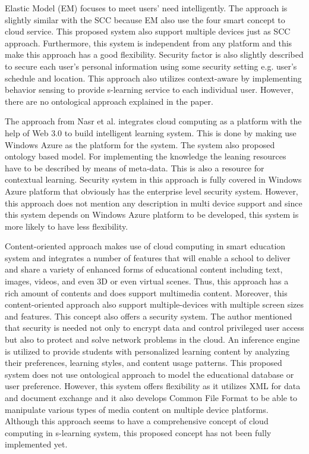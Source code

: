 \documentclass[journal]{vgtc}
\begin{document}
Elastic Model (EM) \cite{Kim2013} focuses to meet users' need intelligently. The approach is slightly similar with the SCC because EM also use the four smart concept to cloud service. This proposed system also support multiple devices just as SCC approach. Furthermore, this system is independent from any platform and this make this approach has a good flexibility. Security factor is also slightly described to secure each user's personal information using some security setting e.g. user's schedule and location. This approach also utilizes context-aware by implementing behavior sensing to provide s-learning service to each individual user. However, there are no ontological approach explained in the paper. 

The approach from Nasr et al. \cite{nasr2012proposed} integrates cloud computing as a platform with the help of Web 3.0 to build intelligent learning system. This is done by making use Windows Azure as the platform for the system. The system also proposed ontology based model. For implementing the knowledge the leaning resources have to be described by means of meta-data. This is also a resource for contextual learning. Security system in this approach is fully covered in Windows Azure platform that obviously has the enterprise level security system. However, this approach does not mention any description in multi device support and since this system depends on Windows Azure platform to be developed, this system is more likely to have less flexibility.

Content-oriented approach \cite{jeong2013content} makes use of cloud computing in smart education system and integrates a number of features that will enable a school to deliver and share a variety of enhanced forms of educational content including text, images, videos, and even 3D or even virtual scenes. Thus, this approach has a rich amount of contents and does support multimedia content. Moreover, this content-oriented approach also support multiple-devices with multiple screen sizes and features. This concept also offers a security system. The author mentioned that security is needed not only to encrypt data and control privileged user access but also to protect and solve network problems in the cloud. An inference engine is utilized to provide students with personalized learning content by analyzing their preferences, learning styles, and content usage patterns. This proposed system does not use ontological approach to model the educational database or user preference. However, this system offers flexibility as it utilizes XML for data and document exchange and it also develops Common File Format to be able to manipulate various types of media content on multiple device platforms. Although this approach seems to have a comprehensive concept of cloud computing in s-learning system, this proposed concept has not been fully implemented yet.
\end{document}
